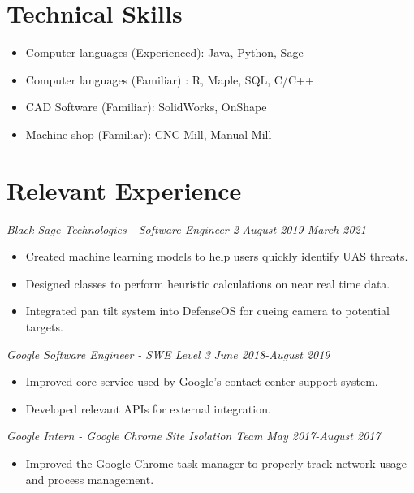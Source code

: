 \documentclass[letterpaper]{article}
\begin{document}
\vspace{.06in}
\section*{Technical Skills}
\begin{itemize}
\item Computer languages (Experienced): Java, Python, Sage 
\item Computer languages (Familiar) : R, Maple, SQL, C/C++
\item CAD Software (Familiar): SolidWorks, OnShape
\item Machine shop (Familiar): CNC Mill, Manual Mill
\end{itemize}

\vspace{.06in}
\section*{Relevant Experience}
\begin{multicols}{2}
\textit{Black Sage Technologies - Software Engineer 2}
\vfill
\columnbreak
\textit{August 2019-March 2021}
\end{multicols}
\begin{itemize}
    \item Created machine learning models to help users quickly identify UAS threats.
    \item Designed classes to perform heuristic calculations on near real time data.
    \item Integrated pan tilt system into DefenseOS for cueing camera to potential targets.
\end{itemize}

\vspace{.06in}

\begin{multicols}{2}
\textit{Google Software Engineer - SWE Level 3}
\vfill
\columnbreak
\textit{June 2018-August 2019}
\end{multicols}
\begin{itemize}
    \item Improved core service used by Google's contact center support system.
    \item Developed relevant APIs for external integration. 
\end{itemize}

\vspace{.06in}

\begin{multicols}{2}
\textit{Google Intern - Google Chrome Site Isolation Team}
\vfill
\columnbreak
\textit{May 2017-August 2017}
\end{multicols}
\begin{itemize}
    \item Improved the Google Chrome task manager to properly track network usage and process management.
\end{itemize}
\end{document}
